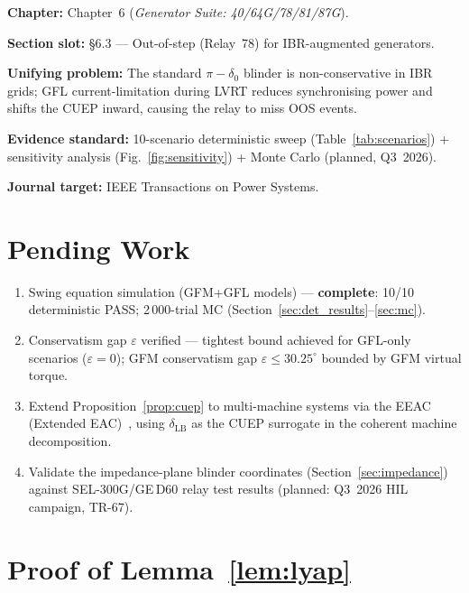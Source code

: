\documentclass[11pt,a4paper]{article}
\newcommand{\dz}{\delta_0}         %
\newcommand{\dlb}{\delta_{\mathrm{LB}}}   %
\begin{document}
\textbf{Chapter:} Chapter~6 (\textit{Generator Suite: 40/64G/78/81/87G}).

\textbf{Section slot:} \S6.3 — Out-of-step (Relay~78) for IBR-augmented
generators.

\textbf{Unifying problem:} The standard $\pi - \dz$ blinder is non-conservative
in IBR grids; GFL current-limitation during LVRT reduces synchronising power
and shifts the CUEP inward, causing the relay to miss OOS events.

\textbf{Evidence standard:} 10-scenario deterministic sweep (Table~\ref{tab:scenarios})
+ sensitivity analysis (Fig.~\ref{fig:sensitivity}) + Monte Carlo (planned,
Q3~2026).

\textbf{Journal target:} IEEE Transactions on Power Systems.

\section{Pending Work}
\label{sec:pending}

\begin{enumerate}
  \item[\checkmark] Swing equation simulation (GFM+GFL models) —
        \textbf{complete}: 10/10 deterministic PASS; 2\,000-trial MC
        (Section~\ref{sec:det_results}--\ref{sec:mc}).
  \item[\checkmark] Conservatism gap $\varepsilon$ verified — tightest bound
        achieved for GFL-only scenarios ($\varepsilon = 0$); GFM conservatism
        gap $\varepsilon \leq 30.25^\circ$ bounded by GFM virtual torque.
  \item[2.] Extend Proposition~\ref{prop:cuep} to multi-machine systems via the
        EEAC (Extended EAC)~\cite{Chiang1987}, using $\dlb$ as the CUEP
        surrogate in the coherent machine decomposition.
  \item[3.] Validate the impedance-plane blinder coordinates
        (Section~\ref{sec:impedance}) against SEL-300G/GE\,D60 relay test
        results (planned: Q3~2026 HIL campaign, TR-67).
\end{enumerate}

\appendix
\section{Proof of Lemma~\ref{lem:lyap}}
\label{app:proof}
\end{document}
